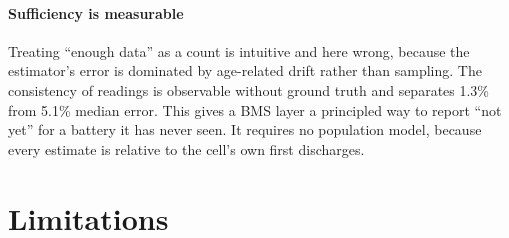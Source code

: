 \documentclass[preprint,12pt,authoryear]{elsarticle}
\begin{document}
\paragraph{Sufficiency is measurable}
Treating ``enough data'' as a count is intuitive and here wrong, because the
estimator's error is dominated by age-related drift rather than sampling. The
consistency of readings is observable without ground truth and separates 1.3\%
from 5.1\% median error. This gives a BMS layer a principled way to report
``not yet'' for a battery it has never seen. It requires no population model,
because every estimate is relative to the cell's own first discharges.

\section{Limitations}
\label{sec:limits}
\end{document}
